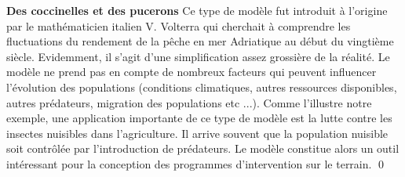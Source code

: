 \begin{exemple}{\bf Des coccinelles et des pucerons}
Ce type de modèle fut introduit à l'origine par le mathématicien italien V. Volterra qui cherchait à comprendre les fluctuations du rendement de la pêche en mer Adriatique au début du vingtième siècle. Evidemment, il s'agit d'une simplification assez grossière de la réalité. Le modèle ne prend pas en compte de nombreux facteurs qui peuvent influencer l'évolution des populations (conditions climatiques, autres ressources disponibles, autres prédateurs, migration des populations etc ...). Comme l'illustre notre exemple, une application importante de ce type de modèle est la lutte contre les insectes nuisibles dans l'agriculture. Il arrive souvent que la population nuisible soit contr\^olée par l'introduction de prédateurs. Le modèle constitue alors un outil intéressant pour la conception des programmes d'intervention sur le terrain. \qed \\
\end{exemple}


